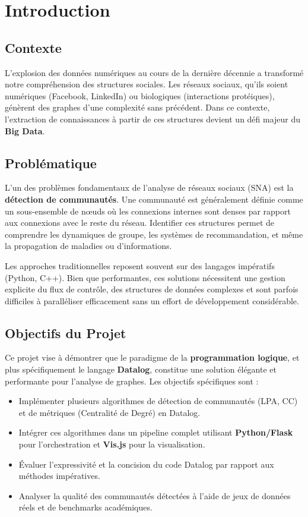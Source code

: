 \documentclass[12pt,a4paper]{report}
\begin{document}
\tableofcontents
\listoffigures
\listoftables

\chapter{Introduction}
\section{Contexte}
L'explosion des données numériques au cours de la dernière décennie a transformé notre compréhension des structures sociales. Les réseaux sociaux, qu'ils soient numériques (Facebook, LinkedIn) ou biologiques (interactions protéiques), génèrent des graphes d'une complexité sans précédent. Dans ce contexte, l'extraction de connaissances à partir de ces structures devient un défi majeur du \textbf{Big Data}.

\section{Problématique}
L'un des problèmes fondamentaux de l'analyse de réseaux sociaux (SNA) est la \textbf{détection de communautés}. Une communauté est généralement définie comme un sous-ensemble de nœuds où les connexions internes sont denses par rapport aux connexions avec le reste du réseau. Identifier ces structures permet de comprendre les dynamiques de groupe, les systèmes de recommandation, et même la propagation de maladies ou d'informations.

Les approches traditionnelles reposent souvent sur des langages impératifs (Python, C++). Bien que performantes, ces solutions nécessitent une gestion explicite du flux de contrôle, des structures de données complexes et sont parfois difficiles à paralléliser efficacement sans un effort de développement considérable.

\section{Objectifs du Projet}
Ce projet vise à démontrer que le paradigme de la \textbf{programmation logique}, et plus spécifiquement le langage \textbf{Datalog}, constitue une solution élégante et performante pour l'analyse de graphes. Les objectifs spécifiques sont :
\begin{itemize}
    \item Implémenter plusieurs algorithmes de détection de communautés (LPA, CC) et de métriques (Centralité de Degré) en Datalog.
    \item Intégrer ces algorithmes dans un pipeline complet utilisant \textbf{Python/Flask} pour l'orchestration et \textbf{Vis.js} pour la visualisation.
    \item Évaluer l'expressivité et la concision du code Datalog par rapport aux méthodes impératives.
    \item Analyser la qualité des communautés détectées à l'aide de jeux de données réels et de benchmarks académiques.
\end{itemize}
\end{document}

